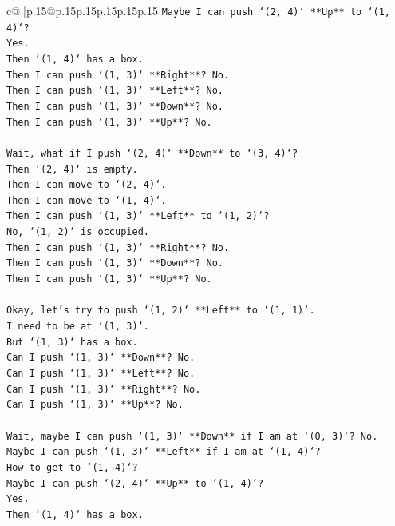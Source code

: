 \documentclass{article}
\begin{document}
{\begin{supertabular}{c@{$\;$}|p{.15\linewidth}@{}p{.15\linewidth}p{.15\linewidth}p{.15\linewidth}p{.15\linewidth}p{.15\linewidth}}
{{{\texttt{Maybe I can push `(2, 4)` **Up** to `(1, 4)`?} \\
\texttt{Yes.} \\
\texttt{Then `(1, 4)` has a box.} \\
\texttt{Then I can push `(1, 3)` **Right**? No.} \\
\texttt{Then I can push `(1, 3)` **Left**? No.} \\
\texttt{Then I can push `(1, 3)` **Down**? No.} \\
\texttt{Then I can push `(1, 3)` **Up**? No.} \\
\\ 
\texttt{Wait, what if I push `(2, 4)` **Down** to `(3, 4)`?} \\
\texttt{Then `(2, 4)` is empty.} \\
\texttt{Then I can move to `(2, 4)`.} \\
\texttt{Then I can move to `(1, 4)`.} \\
\texttt{Then I can push `(1, 3)` **Left** to `(1, 2)`?} \\
\texttt{No, `(1, 2)` is occupied.} \\
\texttt{Then I can push `(1, 3)` **Right**? No.} \\
\texttt{Then I can push `(1, 3)` **Down**? No.} \\
\texttt{Then I can push `(1, 3)` **Up**? No.} \\
\\ 
\texttt{Okay, let's try to push `(1, 2)` **Left** to `(1, 1)`.} \\
\texttt{I need to be at `(1, 3)`.} \\
\texttt{But `(1, 3)` has a box.} \\
\texttt{Can I push `(1, 3)` **Down**? No.} \\
\texttt{Can I push `(1, 3)` **Left**? No.} \\
\texttt{Can I push `(1, 3)` **Right**? No.} \\
\texttt{Can I push `(1, 3)` **Up**? No.} \\
\\ 
\texttt{Wait, maybe I can push `(1, 3)` **Down** if I am at `(0, 3)`? No.} \\
\texttt{Maybe I can push `(1, 3)` **Left** if I am at `(1, 4)`?} \\
\texttt{How to get to `(1, 4)`?} \\
\texttt{Maybe I can push `(2, 4)` **Up** to `(1, 4)`?} \\
\texttt{Yes.} \\
\texttt{Then `(1, 4)` has a box.} \\
}}}
\end{supertabular}}
\end{document}
